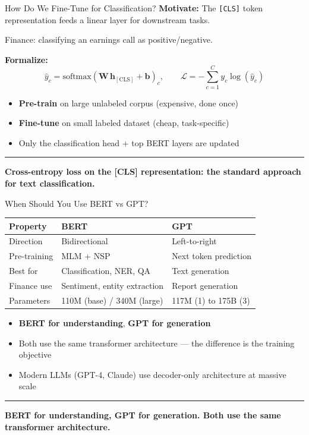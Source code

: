 \documentclass[8pt,aspectratio=169]{beamer}
\newcommand{\bottomnote}[1]{%
\vfill
\vspace{-2mm}
\textcolor{mllavender2}{\rule{\textwidth}{0.4pt}}
\vspace{1mm}
\footnotesize
\textbf{#1}
}
\newenvironment{compactlist}{%
  \begin{itemize}%
    \setlength{\itemsep}{2pt}%
    \setlength{\parskip}{0pt}%
    \setlength{\parsep}{0pt}%
}{%
  \end{itemize}%
}
\newcommand{\highlight}[1]{\textcolor{mlorange}{\textbf{#1}}}
\begin{document}
\begin{frame}{How Do We Fine-Tune for Classification?}
\textbf{Motivate:} The \texttt{[CLS]} token representation feeds a linear layer for downstream tasks.

\vspace{1mm}
Finance: classifying an earnings call as positive/negative.

\vspace{3mm}
\textbf{Formalize:}
\[
\hat{y}_c = \text{softmax}(\mathbf{W}\,\mathbf{h}_{[\text{CLS}]} + \mathbf{b})_c, \qquad \mathcal{L} = -\sum_{c=1}^{C} y_c \log(\hat{y}_c)
\]

\vspace{2mm}
\begin{compactlist}
\item \textbf{Pre-train} on large unlabeled corpus (expensive, done once)
\item \textbf{Fine-tune} on small labeled dataset (cheap, task-specific)
\item Only the classification head + top BERT layers are updated
\end{compactlist}
\bottomnote{Cross-entropy loss on the [CLS] representation: the standard approach for text classification.}
\end{frame}

\begin{frame}{When Should You Use BERT vs GPT?}
\begin{center}
\small
\begin{tabular}{@{}l l l@{}}
\toprule
\textbf{Property} & \textbf{BERT} & \textbf{GPT} \\
\midrule
Direction & Bidirectional & Left-to-right \\
Pre-training & MLM + NSP & Next token prediction \\
Best for & Classification, NER, QA & Text generation \\
Finance use & Sentiment, entity extraction & Report generation \\
Parameters & 110M (base) / 340M (large) & 117M (1) to 175B (3) \\
\bottomrule
\end{tabular}
\normalsize
\end{center}

\vspace{2mm}
\begin{compactlist}
\item \highlight{BERT for understanding}, \highlight{GPT for generation}
\item Both use the same transformer architecture --- the difference is the training objective
\item Modern LLMs (GPT-4, Claude) use decoder-only architecture at massive scale
\end{compactlist}
\bottomnote{BERT for understanding, GPT for generation. Both use the same transformer architecture.}
\end{frame}
\end{document}
